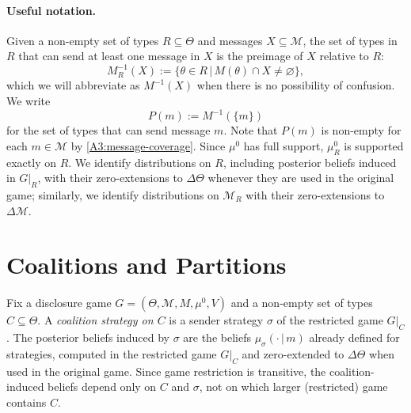\documentclass[11pt]{article}
\newcommand{\sep}{\,|\,}
\newcommand{\Msg}{\mathcal{M}}
\newcommand{\wT}{R}
\begin{document}
\paragraph{Useful notation.} Given a non-empty set of types $\wT \subseteq \Theta$ and messages $X \subseteq \Msg$, the set of types in $\wT$ that can send at least one message in $X$ is the preimage of $X$ relative to $\wT$:
\[
    M^{-1}_{\wT}(X) := \{ \theta \in \wT \sep M(\theta) \cap X \neq \varnothing \},
\]
which we will abbreviate as $M^{-1}(X)$ when there is no possibility of confusion. We write
\[
    P(m) := M^{-1}(\{ m \})
\]
for the set of types that can send message $m$. Note that $P(m)$ is non-empty for each $m \in \Msg$ by \cref{A3:message-coverage}.
Since $\mu^0$ has full support, $\mu^0_{\wT}$ is supported exactly on $\wT$. We identify distributions on $\wT$, including posterior beliefs induced in $G\vert_{\wT}$, with their zero-extensions to $\Delta\Theta$ whenever they are used in the original game; similarly, we identify distributions on $\Msg_{\wT}$ with their zero-extensions to $\Delta\Msg$.

\section{Coalitions and Partitions}\label{sec:coalitions}

Fix a disclosure game $G = (\Theta,\Msg,M,\mu^0,V)$ and a non-empty set of types $C \subseteq \Theta$. A \emph{coalition strategy on $C$} is a sender strategy $\sigma$ of the restricted game $G \vert_C$. The posterior beliefs induced by $\sigma$ are the beliefs $\mu_\sigma(\cdot \sep m)$ already defined for strategies, computed in the restricted game $G\vert_C$ and zero-extended to $\Delta\Theta$ when used in the original game. Since game restriction is transitive, the coalition-induced beliefs depend only on $C$ and $\sigma$, not on which larger (restricted) game contains $C$.
\end{document}
